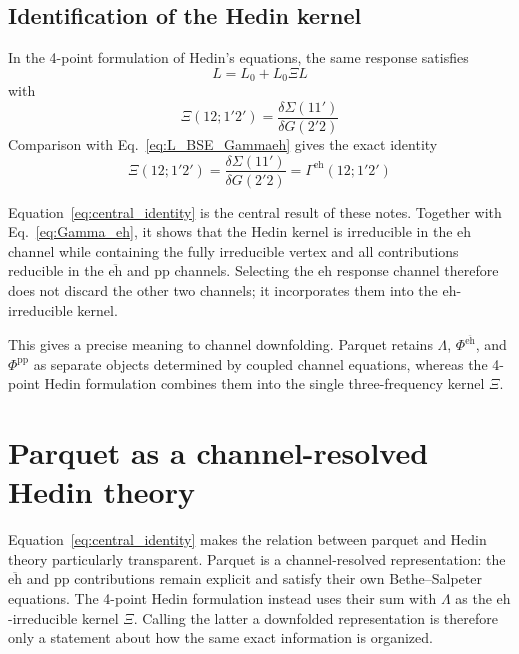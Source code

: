 \documentclass[aip,jcp,reprint,noshowkeys,superscriptaddress]{revtex4-1}
\newcommand{\eh}{\text{eh}}
\newcommand{\teh}{\overline{\text{eh}}}
\newcommand{\pp}{\text{pp}}
\begin{document}
\subsection{Identification of the Hedin kernel}

In the 4-point formulation of Hedin's equations, the same response
satisfies
\begin{equation}
	L
	=
	L_0
	+
	L_0\Xi L
	\label{eq:Hedin4_response}
\end{equation}
with
\begin{equation}
	\Xi(12;1'2')
	=
	\frac{\delta\Sigma(11')}{\delta G(2'2)}
	\label{eq:Xi_def}
\end{equation}
Comparison with Eq.~\eqref{eq:L_BSE_Gammaeh} gives the exact identity
\begin{equation}
	\Xi(12;1'2')
	=
	\frac{\delta\Sigma(11')}{\delta G(2'2)}
	=
	\Gamma^\eh(12;1'2')
	\label{eq:central_identity}
\end{equation}

Equation~\eqref{eq:central_identity} is the central result of these notes.
Together with Eq.~\eqref{eq:Gamma_eh}, it shows that the Hedin kernel is
irreducible in the $\eh$ channel while containing the fully irreducible
vertex and all contributions reducible in the $\teh$ and $\pp$ channels.
Selecting the $\eh$ response channel therefore does not discard the
other two channels; it incorporates them into the $\eh$-irreducible
kernel.

This gives a precise meaning to channel downfolding.
Parquet retains $\Lambda$, $\Phi^{\teh}$, and $\Phi^\pp$ as separate
objects determined by coupled channel equations, whereas the 4-point
Hedin formulation combines them into the single three-frequency kernel
$\Xi$.

\section{Parquet as a channel-resolved Hedin theory}
\label{sec:interpretation}

Equation~\eqref{eq:central_identity} makes the relation between parquet
and Hedin theory particularly transparent.
Parquet is a channel-resolved representation: the $\teh$ and $\pp$
contributions remain explicit and satisfy their own Bethe--Salpeter
equations.
The 4-point Hedin formulation instead uses their sum with $\Lambda$ as
the $\eh$-irreducible kernel $\Xi$.
Calling the latter a downfolded representation is therefore only a
statement about how the same exact information is organized.
\end{document}
